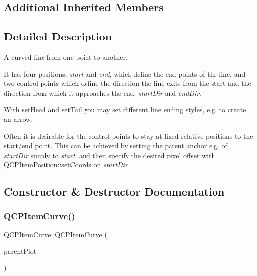 \subsection*{Additional Inherited Members}


\subsection{Detailed Description}
A curved line from one point to another. 

 It has four positions, {\itshape start} and {\itshape end}, which define the end points of the line, and two control points which define the direction the line exits from the start and the direction from which it approaches the end\+: {\itshape start\+Dir} and {\itshape end\+Dir}.

With \mbox{\hyperlink{class_q_c_p_item_curve_a08a30d9cdd63995deea3d9e20430676f}{set\+Head}} and \mbox{\hyperlink{class_q_c_p_item_curve_ac3488d8b1a6489c845dc5bff3ef71124}{set\+Tail}} you may set different line ending styles, e.\+g. to create an arrow.

Often it is desirable for the control points to stay at fixed relative positions to the start/end point. This can be achieved by setting the parent anchor e.\+g. of {\itshape start\+Dir} simply to {\itshape start}, and then specify the desired pixel offset with \mbox{\hyperlink{class_q_c_p_item_position_aa988ba4e87ab684c9021017dcaba945f}{Q\+C\+P\+Item\+Position\+::set\+Coords}} on {\itshape start\+Dir}. 

\subsection{Constructor \& Destructor Documentation}
\mbox{\label{class_q_c_p_item_curve_ac9b7508bb5c8827e1a7a6199f8c82bec}} 
\subsubsection{\texorpdfstring{QCPItemCurve()}{QCPItemCurve()}}
{\footnotesize\ttfamily Q\+C\+P\+Item\+Curve\+::\+Q\+C\+P\+Item\+Curve (\begin{DoxyParamCaption}\item[{\mbox{\hyperlink{class_q_custom_plot}{Q\+Custom\+Plot}} $\ast$}]{parent\+Plot }\end{DoxyParamCaption})\hspace{0.3cm}{\ttfamily [explicit]}}

